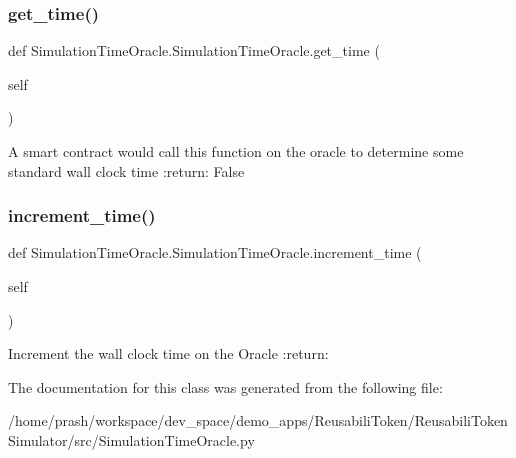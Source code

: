 \subsubsection{\texorpdfstring{get\+\_\+time()}{get\_time()}}
{\footnotesize\ttfamily def Simulation\+Time\+Oracle.\+Simulation\+Time\+Oracle.\+get\+\_\+time (\begin{DoxyParamCaption}\item[{}]{self }\end{DoxyParamCaption})}

\begin{DoxyVerb}A smart contract would call this function on the oracle to determine some standard wall clock
time
:return: False
\end{DoxyVerb}
 \mbox{\label{class_simulation_time_oracle_1_1_simulation_time_oracle_a2a89702650ee07d32b369da6eae552b9}} 
\subsubsection{\texorpdfstring{increment\+\_\+time()}{increment\_time()}}
{\footnotesize\ttfamily def Simulation\+Time\+Oracle.\+Simulation\+Time\+Oracle.\+increment\+\_\+time (\begin{DoxyParamCaption}\item[{}]{self }\end{DoxyParamCaption})}

\begin{DoxyVerb}Increment the wall clock time on the Oracle
:return:
\end{DoxyVerb}
 

The documentation for this class was generated from the following file\+:\begin{DoxyCompactItemize}
\item 
/home/prash/workspace/dev\+\_\+space/demo\+\_\+apps/\+Reusabili\+Token/\+Reusabili\+Token\+Simulator/src/Simulation\+Time\+Oracle.\+py\end{DoxyCompactItemize}
